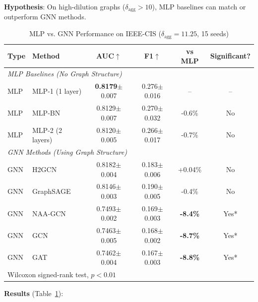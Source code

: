 \textbf{Hypothesis}: On high-dilution graphs ($\delta_{\text{agg}} > 10$), MLP baselines can match or outperform GNN methods.

\begin{table}[t]
\centering
\caption{MLP vs. GNN Performance on IEEE-CIS ($\delta_{\text{agg}} = 11.25$, 15 seeds)}
\label{tab:mlp_baseline}
\small
\begin{tabular}{llcccc}
\toprule
\textbf{Type} & \textbf{Method} & \textbf{AUC}$\uparrow$ & \textbf{F1}$\uparrow$ & \textbf{vs MLP} & \textbf{Significant?} \\
\midrule
\multicolumn{6}{l}{\textit{MLP Baselines (No Graph Structure)}} \\
MLP & MLP-1 (1 layer) & \textbf{0.8179}$\pm$0.007 & 0.276$\pm$0.016 & -- & -- \\
MLP & MLP-BN & 0.8129$\pm$0.007 & 0.270$\pm$0.032 & -0.6\% & No \\
MLP & MLP-2 (2 layers) & 0.8120$\pm$0.005 & 0.266$\pm$0.017 & -0.7\% & No \\
\midrule
\multicolumn{6}{l}{\textit{GNN Methods (Using Graph Structure)}} \\
GNN & H2GCN & 0.8182$\pm$0.004 & 0.183$\pm$0.006 & +0.04\% & No \\
GNN & GraphSAGE & 0.8146$\pm$0.003 & 0.190$\pm$0.005 & -0.4\% & No \\
GNN & NAA-GCN & 0.7493$\pm$0.002 & 0.169$\pm$0.003 & \textbf{-8.4\%} & Yes* \\
GNN & GCN & 0.7463$\pm$0.005 & 0.168$\pm$0.002 & \textbf{-8.7\%} & Yes* \\
GNN & GAT & 0.7462$\pm$0.004 & 0.167$\pm$0.003 & \textbf{-8.8\%} & Yes* \\
\bottomrule
\multicolumn{6}{l}{\footnotesize *Wilcoxon signed-rank test, $p < 0.01$} \\
\end{tabular}
\end{table}

\textbf{Results} (Table~\ref{tab:mlp_baseline}):

